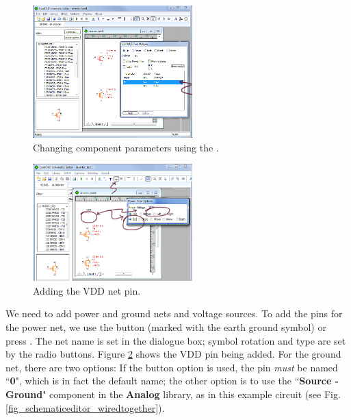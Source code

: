 \begin{figure}
    \includegraphics[width=0.55\textwidth]{./figures/getting_started_figures/SchematicEditor_ChangePMOSWidth.png}
    \caption{Changing component parameters using the .}
  \label{fig_schematiceditor_changePMOSwidth}
\end{figure}

\begin{figure}
    \includegraphics[width=0.55\textwidth]{./figures/getting_started_figures/SchematicEditor_addingVDD.png}
    \caption{{Adding the VDD net pin.}}
  \label{fig_schematiceditor_addVDD}
\end{figure}

 We need to add power and ground nets and voltage sources. To add the pins for the power net, we use the  button (marked with the earth ground symbol) or press .  The net name is set in the dialogue box; symbol rotation and type are set by the radio buttons.  Figure \ref{fig_schematiceditor_addVDD} shows the VDD pin being added.  For the ground net, there are two options:  If the  button option is used, the pin \textit{must} be named ``\textbf{0}", which is in fact the default name; the other option is to use the ``\textbf{Source - Ground}" component in the \textbf{Analog} library,  as in this example circuit (see Fig. \ref{fig_schematiceditor_wiredtogether}).   


